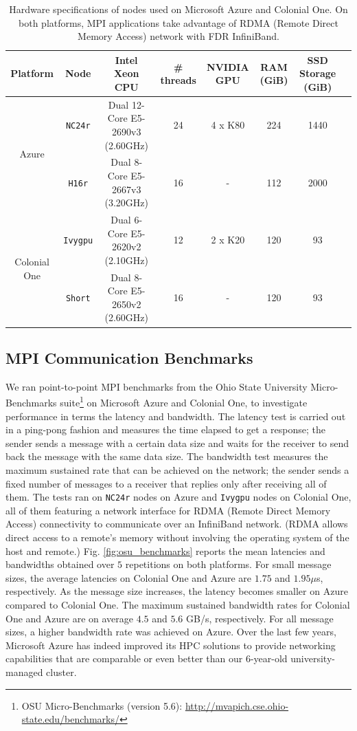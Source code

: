 \documentclass[10pt,journal,compsoc]{IEEEtran}
\begin{document}
\begin{table}[b]
    \renewcommand{\arraystretch}{1.5}
    \caption{Hardware specifications of nodes used on Microsoft Azure and Colonial One. On both platforms, MPI applications take advantage of RDMA (Remote Direct Memory Access) network with FDR InfiniBand.}
    \label{tab:hw_specs}
    \centering
    \begin{tabular}{cccccccc}
        Platform & Node & Intel Xeon CPU & \# threads & NVIDIA GPU & RAM (GiB) & SSD Storage (GiB) \\
        \hline
        \multirow{2}{*}{Azure} & \texttt{NC24r} & Dual 12-Core E5-2690v3 (2.60GHz) & 24 & 4 x K80 & 224 & 1440 \\
        & \texttt{H16r} & Dual 8-Core E5-2667v3 (3.20GHz) & 16 & - & 112 & 2000 \\
        \hline
        \multirow{2}{*}{Colonial One} & \texttt{Ivygpu} & Dual 6-Core E5-2620v2 (2.10GHz) & 12 & 2 x K20 & 120 & 93 \\
        & \texttt{Short} & Dual 8-Core E5-2650v2 (2.60GHz) & 16 & - & 120 & 93 \\
        \hline
    \end{tabular}
\end{table}

\subsection{MPI Communication Benchmarks}\label{subsec:mpi_benchmarks}

We ran point-to-point MPI benchmarks from the Ohio State University Micro-Benchmarks suite\footnote{OSU Micro-Benchmarks (version 5.6): \url{http://mvapich.cse.ohio-state.edu/benchmarks/}} on Microsoft Azure and Colonial One, to investigate performance in terms the latency and bandwidth.
The latency test is carried out in a ping-pong fashion and measures the time elapsed to get a response; the sender sends a message with a certain data size and waits for the receiver to send back the message with the same data size.
The bandwidth test measures the maximum sustained rate that can be achieved on the network; the sender sends a fixed number of messages to a receiver that replies only after receiving all of them.
The tests ran on \texttt{NC24r} nodes on Azure and \texttt{Ivygpu} nodes on Colonial One, all of them featuring a network interface for RDMA (Remote Direct Memory Access) connectivity to communicate over an InfiniBand network.
(RDMA allows direct access to a remote's memory without involving the operating system of the host and remote.)
Fig. \ref{fig:osu_benchmarks} reports the mean latencies and bandwidths obtained over $5$ repetitions on both platforms.
For small message sizes, the average latencies on Colonial One and Azure are $1.75$ and $1.95 \mu $s, respectively.
As the message size increases, the latency becomes smaller on Azure compared to Colonial One.
The maximum sustained bandwidth rates for Colonial One and Azure are on average $4.5$ and $5.6$ GB/s, respectively.
For all message sizes, a higher bandwidth rate was achieved on Azure.
Over the last few years, Microsoft Azure has indeed improved its HPC solutions to provide networking capabilities that are comparable or even better than our 6-year-old university-managed cluster.
\end{document}
